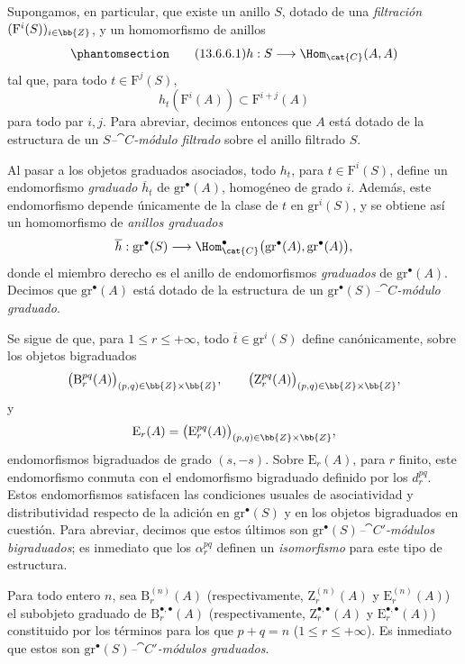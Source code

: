 \documentclass[oneside]{amsart}
\renewcommand{\leq}{\leqslant}
\newcommand{\oldpage}[2][]{{\marginnote{\normalfont\textbf{#1}~|~#2}}\ignorespaces}
\let\EGAOriginalLabel\label
\renewcommand{\label}[1]{\phantomsection\EGAOriginalLabel{#1}}
\begin{document}
\begin{env}[13.6.6]
\label{0.13.6.6}
Supongamos, en particular, que existe un anillo $S$, dotado de una
\emph{filtración} $(\mathrm{F}^i(S))_{i\in\bb{Z}}$, y un homomorfismo
de anillos
\begin{equation}
\label{0.13.6.6.1}
\tag{13.6.6.1}
  h:S\longrightarrow\Hom_{\cat{C}}(A,A)
\end{equation}
\oldpage[0\textsubscript{III}]{75}
tal que, para todo $t\in\mathrm{F}^j(S)$,
\[
  h_t(\mathrm F^i(A))
  \subset
  \mathrm{F}^{i+j}(A)
\]
para todo par $i,j$.
Para abreviar, decimos entonces que $A$ está dotado de la estructura de un
\emph{$S$--$\cat{C}$-módulo filtrado} sobre el anillo filtrado $S$.

Al pasar a los objetos graduados asociados, todo $h_t$, para
$t\in\mathrm{F}^i(S)$, define un endomorfismo \emph{graduado}
$\overline{h}_t$ de $\mathrm{gr}^\bullet(A)$, homogéneo de grado
$i$.
Además, este endomorfismo depende únicamente de la clase de $t$ en
$\mathrm{gr}^i(S)$, y se obtiene así un homomorfismo de
\emph{anillos graduados}
\[
  \overline{h}:
  \mathrm{gr}^\bullet(S)
  \longrightarrow
  \Hom_{\cat{C}}^\bullet
  \bigl(\mathrm{gr}^\bullet(A),\mathrm{gr}^\bullet(A)\bigr),
\]
donde el miembro derecho es el anillo de endomorfismos \emph{graduados} de
$\mathrm{gr}^\bullet(A)$.
Decimos que $\mathrm{gr}^\bullet(A)$ está dotado de la estructura
de un \emph{$\mathrm{gr}^\bullet(S)$--$\cat{C}$-módulo graduado}.

Se sigue de  que, para
$1\leq r\leq+\infty$, todo
$\overline{t}\in\mathrm{gr}^i(S)$ define canónicamente, sobre los
objetos bigraduados
\[
  \bigl(\mathrm{B}_r^{pq}(A)\bigr)_{(p,q)\in\bb{Z}\times\bb{Z}},
  \qquad
  \bigl(\mathrm{Z}_r^{pq}(A)\bigr)_{(p,q)\in\bb{Z}\times\bb{Z}},
\]
y
\[
  \mathrm{E}_r(A)
  =
  \bigl(\mathrm{E}_r^{pq}(A)\bigr)_{(p,q)\in\bb{Z}\times\bb{Z}},
\]
endomorfismos bigraduados de grado $(s,-s)$.
Sobre $\mathrm{E}_r(A)$, para $r$ finito, este endomorfismo conmuta con
el endomorfismo bigraduado definido por los $d_r^{pq}$.
Estos endomorfismos satisfacen las condiciones usuales de asociatividad y
distributividad respecto de la adición en
$\mathrm{gr}^\bullet(S)$ y en los objetos bigraduados en cuestión.
Para abreviar, decimos que estos últimos son
\emph{$\mathrm{gr}^\bullet(S)$--$\cat{C}'$-módulos bigraduados};
es inmediato que los $\alpha_r^{pq}$ definen un \emph{isomorfismo} para
este tipo de estructura.

Para todo entero $n$, sea $\mathrm{B}_r^{(n)}(A)$
(respectivamente, $\mathrm{Z}_r^{(n)}(A)$ y
$\mathrm{E}_r^{(n)}(A)$) el subobjeto graduado de
$\mathrm{B}_r^{\bullet,\bullet}(A)$
(respectivamente, $\mathrm{Z}_r^{\bullet,\bullet}(A)$ y
$\mathrm{E}_r^{\bullet,\bullet}(A)$) constituido por los términos para
los que $p+q=n$ ($1\leq r\leq+\infty$).
Es inmediato que estos son
\emph{$\mathrm{gr}^\bullet(S)$--$\cat{C}'$-módulos graduados}.


\end{env}
\end{document}
